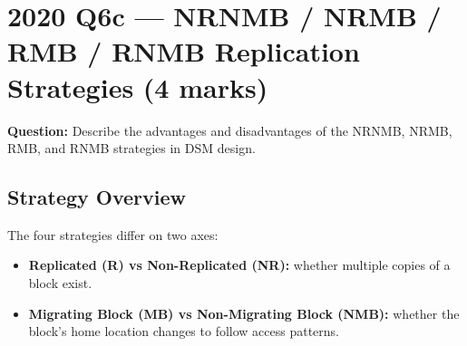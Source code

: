\documentclass[12pt,a4paper]{article}
\begin{document}
\section{2020 Q6c --- NRNMB / NRMB / RMB / RNMB Replication Strategies (4 marks)}

\textbf{Question:} Describe the advantages and disadvantages of the NRNMB, NRMB, RMB, and RNMB strategies in DSM design.

\subsection*{Strategy Overview}

The four strategies differ on two axes:
\begin{itemize}[noitemsep]
  \item \textbf{Replicated (R) vs Non-Replicated (NR):} whether multiple copies of a block exist.
  \item \textbf{Migrating Block (MB) vs Non-Migrating Block (NMB):} whether the block's home location changes to follow access patterns.
\end{itemize}
\end{document}

